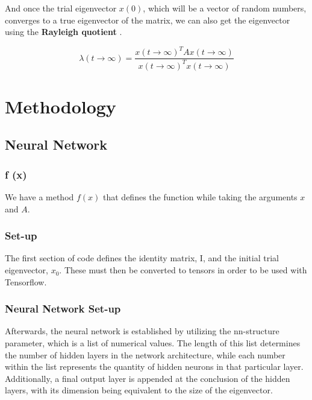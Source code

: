 \documentclass{article}
\begin{document}
And once the trial eigenvector $x(0)$, which will be a vector of random numbers, converges to a true eigenvector of the matrix, we can also get the eigenvector using the \large \textbf{Rayleigh quotient} \normalsize.

\[
    \lambda(t \rightarrow \infty) = \frac{x(t \rightarrow \infty)^{T}Ax(t \rightarrow \infty)}{x(t \rightarrow \infty)^{T}x(t \rightarrow \infty)}  
\]

\section{Methodology}
\subsection{Neural Network}
\subsubsection{f (x)}

We have a method $f(x)$ that defines the function while taking the arguments $x$ and $A$.

\subsubsection{Set-up}
The first section of code defines the identity matrix, I, and the initial trial eigenvector, $x_{0}$. These must then be converted to tensors in order to be used with Tensorflow.

\subsubsection{Neural Network Set-up}
Afterwards, the neural network is established by utilizing the nn-structure parameter, which is a list of numerical values. The length of this list determines the number of hidden layers in the network architecture, while each number within the list represents the quantity of hidden neurons in that particular layer. Additionally, a final output layer is appended at the conclusion of the hidden layers, with its dimension being equivalent to the size of the eigenvector.
\end{document}
